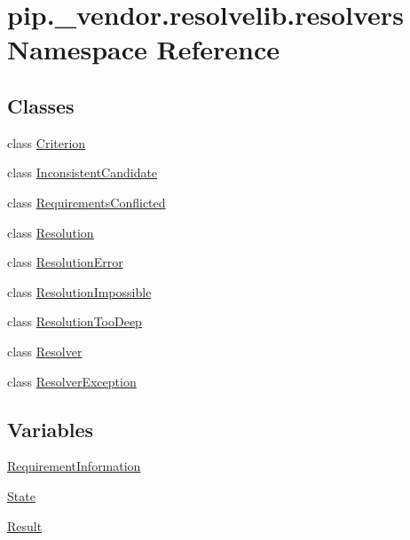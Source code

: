 \hypertarget{namespacepip_1_1__vendor_1_1resolvelib_1_1resolvers}{}\section{pip.\+\_\+vendor.\+resolvelib.\+resolvers Namespace Reference}
\label{namespacepip_1_1__vendor_1_1resolvelib_1_1resolvers}
\subsection*{Classes}
\begin{DoxyCompactItemize}
\item 
class \hyperlink{classpip_1_1__vendor_1_1resolvelib_1_1resolvers_1_1Criterion}{Criterion}
\item 
class \hyperlink{classpip_1_1__vendor_1_1resolvelib_1_1resolvers_1_1InconsistentCandidate}{Inconsistent\+Candidate}
\item 
class \hyperlink{classpip_1_1__vendor_1_1resolvelib_1_1resolvers_1_1RequirementsConflicted}{Requirements\+Conflicted}
\item 
class \hyperlink{classpip_1_1__vendor_1_1resolvelib_1_1resolvers_1_1Resolution}{Resolution}
\item 
class \hyperlink{classpip_1_1__vendor_1_1resolvelib_1_1resolvers_1_1ResolutionError}{Resolution\+Error}
\item 
class \hyperlink{classpip_1_1__vendor_1_1resolvelib_1_1resolvers_1_1ResolutionImpossible}{Resolution\+Impossible}
\item 
class \hyperlink{classpip_1_1__vendor_1_1resolvelib_1_1resolvers_1_1ResolutionTooDeep}{Resolution\+Too\+Deep}
\item 
class \hyperlink{classpip_1_1__vendor_1_1resolvelib_1_1resolvers_1_1Resolver}{Resolver}
\item 
class \hyperlink{classpip_1_1__vendor_1_1resolvelib_1_1resolvers_1_1ResolverException}{Resolver\+Exception}
\end{DoxyCompactItemize}
\subsection*{Variables}
\begin{DoxyCompactItemize}
\item 
\hyperlink{namespacepip_1_1__vendor_1_1resolvelib_1_1resolvers_a0ee3e1ea6b73f0491709189323101657}{Requirement\+Information}
\item 
\hyperlink{namespacepip_1_1__vendor_1_1resolvelib_1_1resolvers_a2f7af37dc98eabe65cc31b391133c6f2}{State}
\item 
\hyperlink{namespacepip_1_1__vendor_1_1resolvelib_1_1resolvers_a22d067c6fd664aeed9989e054e037b7e}{Result}
\end{DoxyCompactItemize}


